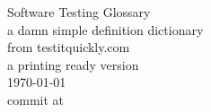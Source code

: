 \documentclass[a4paper, twoside, 12pt]{article}
\begin{document}
\thispagestyle{empty}
{\begingroup
\centering
\vfill
{\Huge Software Testing Glossary}\\[\baselineskip]
{\Large a damn simple definition dictionary}\\ [\baselineskip] 
{from testitquickly.com}\\ [\baselineskip]
{a printing ready version}\\ [\baselineskip] 

\vfill \null
\today \\commit \texttt{\gitAbbrevHash} at \gitBranch\par
\endgroup}

	\newpage



	\newpage
	


	\newpage

\tableofcontents

	\newpage

\pagestyle{plain}
\end{document}
